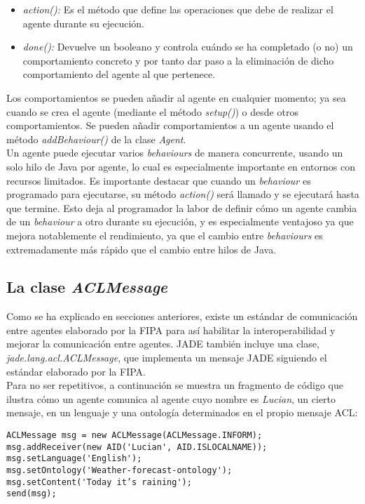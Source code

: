 \begin{itemize}
	\item \textit{action():} Es el método que define las operaciones que debe de realizar el agente durante su ejecución.
	\item \textit{done():} Devuelve un booleano y controla cuándo se ha completado (o no) un comportamiento concreto y por tanto dar paso a la eliminación de dicho comportamiento del agente al que pertenece.
\end{itemize}

Los comportamientos se pueden añadir al agente en cualquier momento; ya sea cuando se crea el agente (mediante el método \textit{setup()}) o desde otros comportamientos. Se pueden añadir comportamientos a un agente usando el método \textit{addBehaviour()} de la clase \textit{Agent}.\\

Un agente puede ejecutar varios \textit{behaviours} de manera concurrente, usando un solo hilo de Java por agente, lo cual es especialmente importante en entornos con recursos limitados. Es importante destacar que cuando un \textit{behaviour} es programado para ejecutarse, su método \textit{action()} será llamado y se ejecutará hasta que termine. Esto deja al programador la labor de definir cómo un agente cambia de un \textit{behaviour} a otro durante su ejecución, y es especialmente ventajoso ya que mejora notablemente el rendimiento, ya que el cambio entre \textit{behaviours} es extremadamente más rápido que el cambio entre hilos de Java.

\subsection{La clase \textit{ACLMessage}}

Como se ha explicado en secciones anteriores, existe un estándar de comunicación entre agentes elaborado por la FIPA para así habilitar la interoperabilidad y mejorar la comunicación entre agentes. JADE también incluye una clase, \textit{jade.lang.acl.ACLMessage}, que implementa un mensaje JADE siguiendo el estándar elaborado por la FIPA.\\

Para no ser repetitivos, a continuación se muestra un fragmento de código que ilustra cómo un agente comunica al agente cuyo nombre es \textit{Lucian}, un cierto mensaje, en un lenguaje y una ontología determinados en el propio mensaje ACL:

\begin{lstlisting}
ACLMessage msg = new ACLMessage(ACLMessage.INFORM);
msg.addReceiver(new AID('Lucian', AID.ISLOCALNAME));
msg.setLanguage('English');
msg.setOntology('Weather-forecast-ontology');
msg.setContent('Today it’s raining');
send(msg);
\end{lstlisting}

